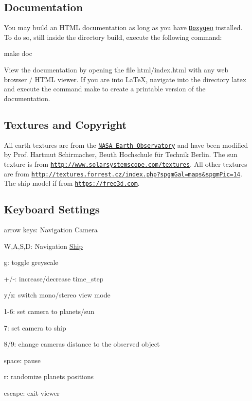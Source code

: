 \subsection*{Documentation }

You may build an H\+T\+ML documentation as long as you have \href{www.doxygen.org/}{\tt Doxygen} installed. To do so, still inside the directory {\ttfamily build}, execute the following command\+: \begin{DoxyVerb}make doc
\end{DoxyVerb}


View the documentation by opening the file {\ttfamily html/index.\+html} with any web browser / H\+T\+ML viewer. If you are into La\+TeX, navigate into the directory {\ttfamily latex} and execute the command {\ttfamily make} to create a printable version of the documentation.

\subsection*{Textures and Copyright }

All earth textures are from the \href{http://earthobservatory.nasa.gov/Features/BlueMarble/}{\tt N\+A\+SA Earth Observatory} and have been modified by Prof. Hartmut Schirmacher, Beuth Hochschule für Technik Berlin. The sun texture is from \href{http://www.solarsystemscope.com/textures}{\tt http\+://www.\+solarsystemscope.\+com/textures}. All other textures are from \href{http://textures.forrest.cz/index.php?spgmGal=maps&spgmPic=14}{\tt http\+://textures.\+forrest.\+cz/index.\+php?spgm\+Gal=maps\&spgm\+Pic=14}. The ship model if from \href{https://free3d.com}{\tt https\+://free3d.\+com}.

\subsection*{Keyboard Settings }


\begin{DoxyItemize}
\item arrow keys\+: Navigation Camera
\item W,A,S,D\+: Navigation \hyperlink{classShip}{Ship}
\item g\+: toggle greyscale
\item +/-\/\+: increase/decrease time\+\_\+step
\item y/z\+: switch mono/stereo view mode
\item 1-\/6\+: set camera to planets/sun
\item 7\+: set camera to ship
\item 8/9\+: change camera\textquotesingle{}s distance to the observed object
\item space\+: pause
\item r\+: randomize planets\textquotesingle{} positions
\item escape\+: exit viewer
\end{DoxyItemize}

